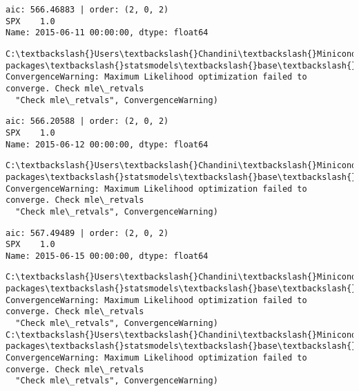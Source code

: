 \documentclass[11pt]{article}
\begin{document}
    \begin{Verbatim}[commandchars=\\\{\}]
aic: 566.46883 | order: (2, 0, 2)
SPX    1.0
Name: 2015-06-11 00:00:00, dtype: float64

    \end{Verbatim}

    \begin{Verbatim}[commandchars=\\\{\}]
C:\textbackslash{}Users\textbackslash{}Chandini\textbackslash{}Miniconda3\textbackslash{}envs\textbackslash{}auquan\textbackslash{}lib\textbackslash{}site-packages\textbackslash{}statsmodels\textbackslash{}base\textbackslash{}model.py:496: ConvergenceWarning: Maximum Likelihood optimization failed to converge. Check mle\_retvals
  "Check mle\_retvals", ConvergenceWarning)

    \end{Verbatim}

    \begin{Verbatim}[commandchars=\\\{\}]
aic: 566.20588 | order: (2, 0, 2)
SPX    1.0
Name: 2015-06-12 00:00:00, dtype: float64

    \end{Verbatim}

    \begin{Verbatim}[commandchars=\\\{\}]
C:\textbackslash{}Users\textbackslash{}Chandini\textbackslash{}Miniconda3\textbackslash{}envs\textbackslash{}auquan\textbackslash{}lib\textbackslash{}site-packages\textbackslash{}statsmodels\textbackslash{}base\textbackslash{}model.py:496: ConvergenceWarning: Maximum Likelihood optimization failed to converge. Check mle\_retvals
  "Check mle\_retvals", ConvergenceWarning)

    \end{Verbatim}

    \begin{Verbatim}[commandchars=\\\{\}]
aic: 567.49489 | order: (2, 0, 2)
SPX    1.0
Name: 2015-06-15 00:00:00, dtype: float64

    \end{Verbatim}

    \begin{Verbatim}[commandchars=\\\{\}]
C:\textbackslash{}Users\textbackslash{}Chandini\textbackslash{}Miniconda3\textbackslash{}envs\textbackslash{}auquan\textbackslash{}lib\textbackslash{}site-packages\textbackslash{}statsmodels\textbackslash{}base\textbackslash{}model.py:496: ConvergenceWarning: Maximum Likelihood optimization failed to converge. Check mle\_retvals
  "Check mle\_retvals", ConvergenceWarning)
C:\textbackslash{}Users\textbackslash{}Chandini\textbackslash{}Miniconda3\textbackslash{}envs\textbackslash{}auquan\textbackslash{}lib\textbackslash{}site-packages\textbackslash{}statsmodels\textbackslash{}base\textbackslash{}model.py:496: ConvergenceWarning: Maximum Likelihood optimization failed to converge. Check mle\_retvals
  "Check mle\_retvals", ConvergenceWarning)

    \end{Verbatim}
\end{document}

